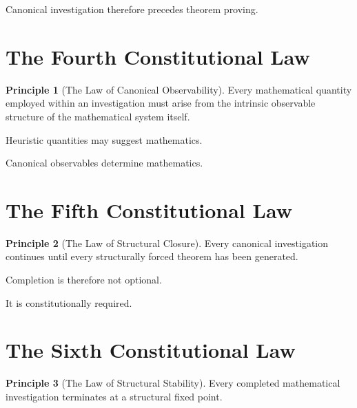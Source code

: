 \documentclass[13pt,openany]{book}
\theoremstyle{plain}
\theoremstyle{definition}
\newtheorem{principle}{Principle}[chapter]
\begin{document}
Canonical investigation therefore precedes theorem proving.

\section{The Fourth Constitutional Law}

\begin{principle}[The Law of Canonical Observability]

Every mathematical quantity employed within an investigation must arise from
the intrinsic observable structure of the mathematical system itself.

\end{principle}

Heuristic quantities may suggest mathematics.

Canonical observables determine mathematics.

\section{The Fifth Constitutional Law}

\begin{principle}[The Law of Structural Closure]

Every canonical investigation continues until every structurally forced theorem
has been generated.

\end{principle}

Completion is therefore not optional.

It is constitutionally required.

\section{The Sixth Constitutional Law}

\begin{principle}[The Law of Structural Stability]

Every completed mathematical investigation terminates at a structural fixed
point.

\end{principle}
\end{document}
